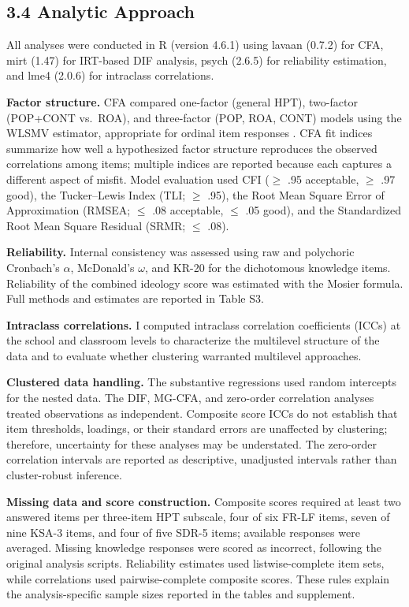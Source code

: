 \documentclass[PCJ,Unicode,screen,mode=plain]{cedram}
\begin{document}
\subsection*{3.4 Analytic Approach}\label{analytic-approach}

All analyses were conducted in R (version 4.6.1) using lavaan (0.7.2) for
CFA, mirt (1.47) for IRT-based DIF analysis, psych (2.6.5) for reliability
estimation, and lme4 (2.0.6) for intraclass correlations.

\textbf{Factor structure.} CFA compared one-factor (general HPT), two-factor (POP+CONT vs.~ROA), and three-factor (POP, ROA, CONT) models using the WLSMV estimator, appropriate for ordinal item responses \citep{Flora2004}. CFA fit indices summarize how well a hypothesized factor structure reproduces the observed correlations among items; multiple indices are reported because each captures a different aspect of misfit. Model evaluation used CFI (\(\geq\) .95 acceptable, \(\geq\) .97
good), the Tucker--Lewis Index (TLI; \(\geq\) .95), the Root Mean
Square Error of Approximation (RMSEA; \(\leq\) .08 acceptable,
\(\leq\) .05 good), and the Standardized Root Mean Square Residual
(SRMR; \(\leq\) .08).

\textbf{Reliability.} Internal consistency was assessed using raw and
polychoric Cronbach's \(\alpha\), McDonald's \(\omega\), and KR-20 for
the dichotomous knowledge items. Reliability of the combined ideology
score was estimated with the Mosier formula. Full methods and estimates
are reported in Table S3.

\textbf{Intraclass correlations.} I computed intraclass correlation
coefficients (ICCs) at the school and classroom levels to characterize
the multilevel structure of the data and to evaluate whether
clustering warranted multilevel approaches.

\textbf{Clustered data handling.} The substantive regressions used
random intercepts for the nested data. The DIF, MG-CFA, and zero-order
correlation analyses treated observations as independent. Composite
score ICCs do not establish that item thresholds, loadings, or their
standard errors are unaffected by clustering; therefore, uncertainty
for these analyses may be understated. The zero-order correlation
intervals are reported as descriptive, unadjusted intervals rather than
cluster-robust inference.

\textbf{Missing data and score construction.} Composite scores required
at least two answered items per three-item HPT
subscale, four of six FR-LF items, seven of nine KSA-3 items, and four
of five SDR-5 items; available responses were averaged. Missing
knowledge responses were scored as incorrect, following the original
analysis scripts. Reliability estimates used listwise-complete item
sets, while correlations used pairwise-complete composite scores. These
rules explain the analysis-specific sample sizes reported in the tables
and supplement.
\end{document}
